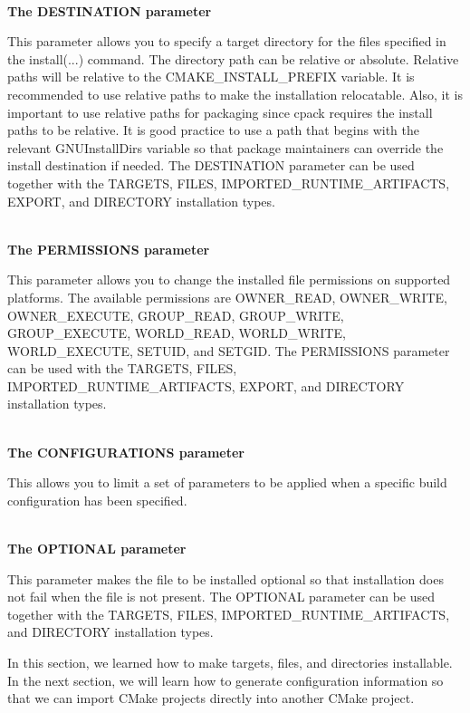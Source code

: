 \hspace*{\fill} \\ %
\noindent
\textbf{The DESTINATION parameter}

This parameter allows you to specify a target directory for the files specified in the install(...) command. The directory path can be relative or absolute. Relative paths will be relative to the CMAKE\_INSTALL\_PREFIX variable. It is recommended to use relative paths to make the installation relocatable. Also, it is important to use relative paths for packaging since cpack requires the install paths to be relative. It is good practice to use a path that begins with the relevant GNUInstallDirs variable so that package maintainers can override the install destination if needed. The DESTINATION parameter can be used together with the TARGETS, FILES, IMPORTED\_RUNTIME\_ARTIFACTS, EXPORT, and DIRECTORY installation types.

\hspace*{\fill} \\ %
\noindent
\textbf{The PERMISSIONS parameter}

This parameter allows you to change the installed file permissions on supported platforms. The available permissions are OWNER\_READ, OWNER\_WRITE, OWNER\_EXECUTE, GROUP\_READ, GROUP\_WRITE, GROUP\_EXECUTE, WORLD\_READ, WORLD\_WRITE, WORLD\_EXECUTE, SETUID, and SETGID. The PERMISSIONS parameter can be used with the TARGETS, FILES, IMPORTED\_RUNTIME\_ARTIFACTS, EXPORT, and DIRECTORY installation types.

\hspace*{\fill} \\ %
\noindent
\textbf{The CONFIGURATIONS parameter}

This allows you to limit a set of parameters to be applied when a specific build configuration has been specified.

\hspace*{\fill} \\ %
\noindent
\textbf{The OPTIONAL parameter}

This parameter makes the file to be installed optional so that installation does not fail when the file is not present. The OPTIONAL parameter can be used together with the TARGETS, FILES, IMPORTED\_RUNTIME\_ARTIFACTS, and DIRECTORY installation types.

In this section, we learned how to make targets, files, and directories installable. In the next section, we will learn how to generate configuration information so that we can import CMake projects directly into another CMake project.











